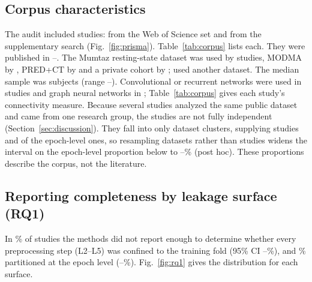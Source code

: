 
\subsection{Corpus characteristics}
The audit included \NincludedTotal{} studies: \NincludedWos{} from the Web of Science set and \NincludedSupp{} from the supplementary search (Fig.~\ref{fig:prisma}). Table~\ref{tab:corpus} lists each. They were published in \YearMin--\YearMax. The Mumtaz resting-state dataset was used by \DataMumtaz{} studies, MODMA by \DataMODMA, PRED+CT by \DataPREDCT{} and a private cohort by \DataPrivate; \DataOther{} used another dataset. The median sample was \NsubjMedian{} subjects (range \NsubjMin--\NsubjMax). Convolutional or recurrent networks were used in \ArchCNN{} studies and graph neural networks in \ArchGNN; Table~\ref{tab:corpus} gives each study's connectivity measure.
Because several studies analyzed the same public dataset and \NgroupStudies{} came from one research group, the studies are not fully independent (Section~\ref{sec:discussion}).
They fall into only \ClDatasetN{} dataset clusters, \TopDataset{} supplying \TopDatasetN{} studies and \TopDatasetEpoch{} of the \NepochTotal{} epoch-level ones, so resampling datasets rather than studies widens the interval on the epoch-level proportion below to \ClEpochDsLo--\ClEpochDsHi\% (post hoc). These proportions describe the corpus, not the literature.

\subsection{Reporting completeness by leakage surface (RQ1)}
In \PctUnclearAny\% of studies the methods did not report enough to determine whether every preprocessing step (L2--L5) was confined to the training fold (95\% CI \PctUnclearAnyLo--\PctUnclearAnyHi\%), and \PctEpoch\% partitioned at the epoch level (\PctEpochLo--\PctEpochHi\%). Fig.~\ref{fig:rq1} gives the distribution for each surface.

